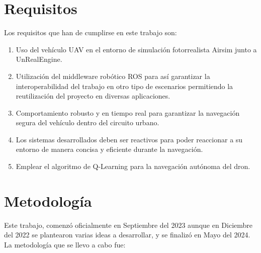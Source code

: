 \section{Requisitos}
\label{sec:requisitos}

Los requisitos que han de cumplirse en este trabajo son: 
\begin{enumerate}
    \item Uso del vehículo UAV en el entorno de simulación fotorrealista Airsim junto a UnRealEngine.
    \item Utilización del middleware robótico ROS para así garantizar la interoperabilidad del trabajo en otro tipo de escenarios permitiendo
    la reutilización del proyecto en diversas aplicaciones. 
    \item Comportamiento robusto y en tiempo real para garantizar la navegación segura del vehículo dentro del circuito urbano.
    \item Los sistemas desarrollados deben ser reactivos para poder reaccionar a su entorno de manera concisa y eficiente durante
    la navegación.
    \item Emplear el algoritmo de Q-Learning para la navegación autónoma del dron. 
\end{enumerate}


\section{Metodología}
\label{sec:metodologia}

Este trabajo, comenzó oficialmente en Septiembre del 2023 aunque en Diciembre del 2022 se plantearon varias ideas a desarrollar, y se finalizó en Mayo del 2024. \\

La metodología que se llevo a cabo fue:

